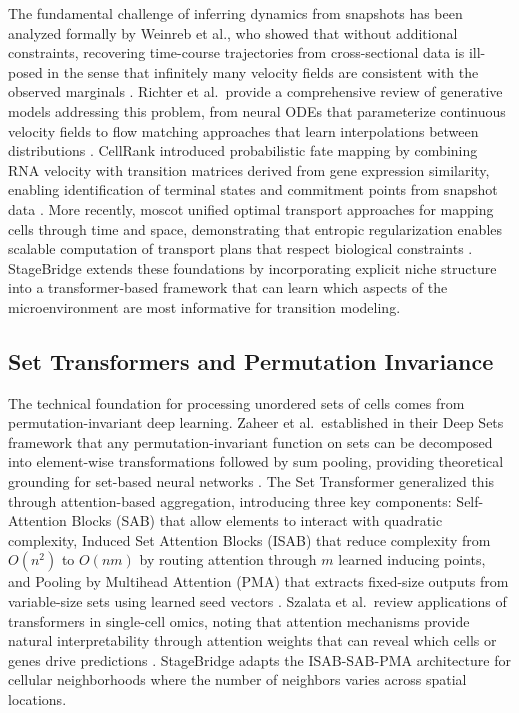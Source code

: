 \documentclass[conference]{IEEEtran}
\begin{document}
The fundamental challenge of inferring dynamics from snapshots has been analyzed formally by Weinreb et al., who showed that without additional constraints, recovering time-course trajectories from cross-sectional data is ill-posed in the sense that infinitely many velocity fields are consistent with the observed marginals \cite{Weinreb2018-jq}. Richter et al.\ provide a comprehensive review of generative models addressing this problem, from neural ODEs that parameterize continuous velocity fields to flow matching approaches that learn interpolations between distributions \cite{Richter2026-ib}. CellRank introduced probabilistic fate mapping by combining RNA velocity with transition matrices derived from gene expression similarity, enabling identification of terminal states and commitment points from snapshot data \cite{Weiler2026-th}. More recently, moscot unified optimal transport approaches for mapping cells through time and space, demonstrating that entropic regularization enables scalable computation of transport plans that respect biological constraints \cite{Klein2025-jg}. StageBridge extends these foundations by incorporating explicit niche structure into a transformer-based framework that can learn which aspects of the microenvironment are most informative for transition modeling.

\subsection{Set Transformers and Permutation Invariance}

The technical foundation for processing unordered sets of cells comes from permutation-invariant deep learning. Zaheer et al.\ established in their Deep Sets framework that any permutation-invariant function on sets can be decomposed into element-wise transformations followed by sum pooling, providing theoretical grounding for set-based neural networks \cite{Zaheer2017-gu}. The Set Transformer generalized this through attention-based aggregation, introducing three key components: Self-Attention Blocks (SAB) that allow elements to interact with quadratic complexity, Induced Set Attention Blocks (ISAB) that reduce complexity from $O(n^2)$ to $O(nm)$ by routing attention through $m$ learned inducing points, and Pooling by Multihead Attention (PMA) that extracts fixed-size outputs from variable-size sets using learned seed vectors \cite{Lee2018-ya}. Szalata et al.\ review applications of transformers in single-cell omics, noting that attention mechanisms provide natural interpretability through attention weights that can reveal which cells or genes drive predictions \cite{Szalata2024-jl}. StageBridge adapts the ISAB-SAB-PMA architecture for cellular neighborhoods where the number of neighbors varies across spatial locations.
\end{document}
